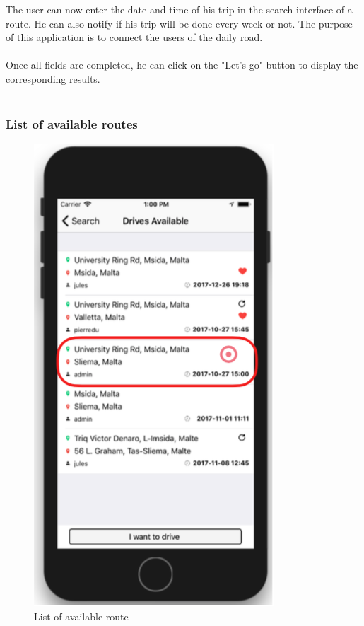 The user can now enter the date and time of his trip in the search interface of a route. He can also notify if his trip will be done every week or not. The purpose of this application is to connect the users of the daily road.
\\\\
Once all fields are completed, he can click on the "Let's go" button to display the corresponding results.
\\\\

\subsubsection{List of available routes}

\begin{figure}[h!]
\begin{center}
\includegraphics[scale = 0.3]{diagrams/ListAvailableRoutes.png} 
\end{center}
\caption{List of available route}
\end{figure}

